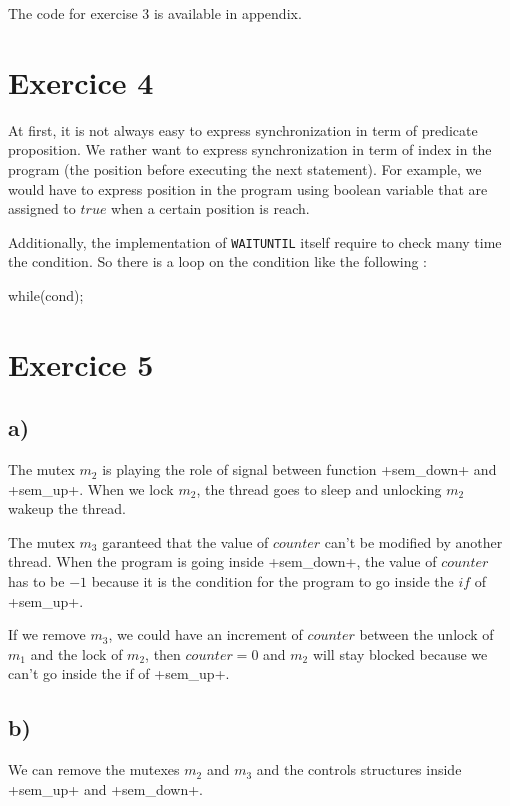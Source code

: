 \documentclass[a4paper,11pt]{report}
\begin{document}
The code for exercise 3 is available in appendix.

\section*{Exercice 4}

At first, it is not always easy to express synchronization in term of predicate
proposition. We rather want to express synchronization in term of index in the
program (the position before executing the next statement). For example, we
would have to express position in the program using boolean variable that are
assigned to $true$ when a certain position is reach.

Additionally, the implementation of \verb+WAITUNTIL+ itself require to check
many time the condition. So there is a loop on the condition like the following
:
\begin{ccode}
while(cond);
\end{ccode}

\section*{Exercice 5}

\subsection*{a)}
The mutex $m_2$ is playing the role of signal between function
\cinline+sem_down+ and \cinline+sem_up+. When we lock $m_2$, the thread goes to
sleep and unlocking $m_2$ wakeup the thread.

The mutex $m_3$ garanteed that the value of $counter$ can't be modified by
another thread. When the program is going inside \cinline+sem_down+, the value
of $counter$ has to be $-1$ because it is the condition for the program to go
inside the $if$ of \cinline+sem_up+.

If we remove $m_3$, we could have an increment of $counter$ between the unlock
of $m_1$ and the lock of $m_2$, then $counter = 0$ and $m_2$ will stay blocked
because we can't go inside the if of \cinline+sem_up+.

\subsection*{b)}

We can remove the mutexes $m_2$ and $m_3$ and the controls structures inside
\cinline+sem_up+ and \cinline+sem_down+.
\end{document}
